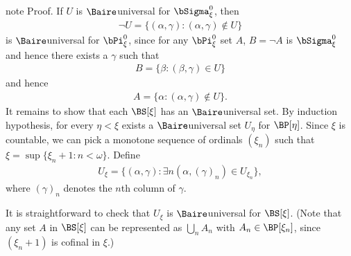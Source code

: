 \documentclass[letterpaper,10pt,english]{jupyterBook}
\begin{document}
\begin{sphinxadmonition}{note}
\sphinxAtStartPar
Proof. If \(U\) is \(\Baire\)\sphinxhyphen{}universal for \(\bSigma^0_\xi\), then
\begin{equation*}
\begin{split}
    \neg U = \{ (\alpha,\gamma) \colon (\alpha,\gamma) \not\in U \}
\end{split}
\end{equation*}
\sphinxAtStartPar
is \(\Baire\)\sphinxhyphen{}universal for \(\bPi^0_\xi\), since for any \(\bPi^0_\xi\) set \(A\), \(B = \neg A\) is \(\bSigma^0_\xi\) and hence there exists a \(\gamma\) such that
\begin{equation*}
\begin{split}
    B = \{\beta \colon (\beta,\gamma) \in U \}
\end{split}
\end{equation*}
\sphinxAtStartPar
and hence
\begin{equation*}
\begin{split}
    A = \{ \alpha \colon (\alpha,\gamma) \not\in U \}. 
\end{split}
\end{equation*}
\sphinxAtStartPar
It remains to show that each \(\BS[\xi]\) has an \(\Baire\)\sphinxhyphen{}universal set. By induction hypothesis, for every \(\eta < \xi\) exists a \(\Baire\)\sphinxhyphen{}universal set \(U_\eta\) for \(\BP[\eta]\). Since \(\xi\) is countable, we can pick a monotone  sequence of ordinals \((\xi_n)\) such that \(\xi = \sup \{\xi_n + 1 \colon n < \omega \}\). Define
\begin{equation*}
\begin{split}
    U_\xi =  \{ (\alpha, \gamma) \colon \exists n (\alpha, (\gamma)_n) \in U_{\xi_n} \},
\end{split}
\end{equation*}
\sphinxAtStartPar
where \((\gamma)_n\) denotes the \(n\)th column of \(\gamma\).

\sphinxAtStartPar
It is straightforward to check that \(U_\xi\) is \(\Baire\)\sphinxhyphen{}universal for \(\BS[\xi]\). (Note that any set \(A\) in \(\BS[\xi]\) can be represented as \(\bigcup_n A_n\) with \(A_n \in \BP[\xi_n]\), since \((\xi_n+1)\) is cofinal in \(\xi\).)
\end{sphinxadmonition}
\end{document}
